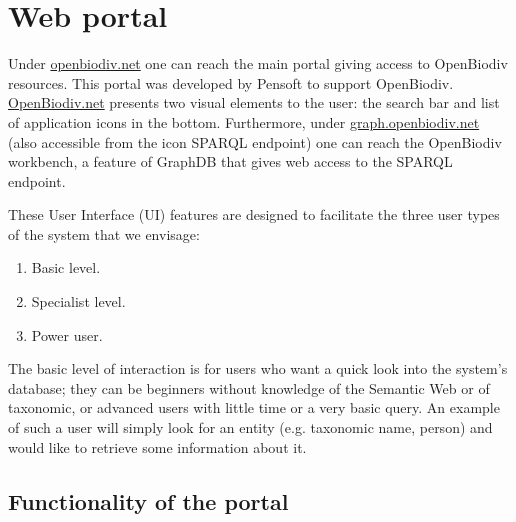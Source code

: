 
\chapter{Web portal} %
\label{chapter-webportal}


Under \href{http://openbiodiv.net}{\url{openbiodiv.net}} one can reach the main portal giving access to OpenBiodiv resources. This portal was developed by Pensoft to support OpenBiodiv. \href{http://openbiodiv.net}{OpenBiodiv.net} presents two visual elements to the user: the search bar and list of application icons in the bottom. Furthermore, under \href{http://graph.openbiodiv.net}{\url{graph.openbiodiv.net}} (also accessible from the icon SPARQL endpoint) one can reach the OpenBiodiv workbench, a feature of GraphDB that gives web access to the SPARQL endpoint.

These User Interface (UI) features are designed to facilitate the three user types of the system that we envisage:

\begin{enumerate}
    \item Basic level.
    \item Specialist level.
    \item Power user.
\end{enumerate}

The basic level of interaction is for users who want a quick look into the system's database; they can be beginners without knowledge of the Semantic Web or of taxonomic, or advanced users with little time or a very basic query. An example of such a user will simply look for an entity (e.g. taxonomic name, person) and would like to retrieve some information about it.


\section{Functionality of the portal}

